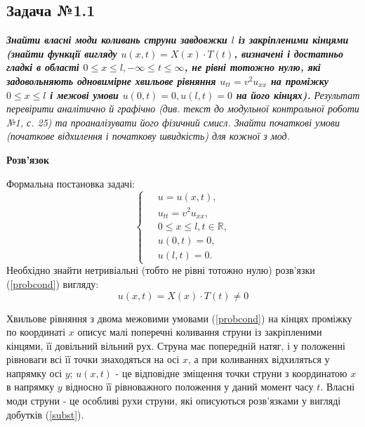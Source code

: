\subsection*{Задача №1.1}

\textit{\textbf{Знайти власні моди коливань струни завдовжки $l$ із закріпленими кінцями (знайти функції вигляду $u(x,t) = X(x) \cdot T(t)$, визначені і достатньо гладкі в області $0 \leq x \leq l, -\infty \leq t \leq \infty$, не рівні тотожно нулю, які задовольняють одновимірне хвильове рівняння $u_{tt} = v^2 u_{xx}$ на проміжку $0 \leq x \leq l$ і межові умови $u(0,t) = 0, u(l,t) = 0$ на його кінцях).} Результат перевірити аналітично й графічно (див. текст до модульної контрольної роботи №1, с. 25) та проаналізувати його фізичний смисл. Знайти початкові умови (початкове відхилення і початкову швидкість) для кожної з мод.}

\begin{center}
    \large{\textbf{Розв'язок}}
\end{center}

\noindent Формальна постановка задачі:
\begin{equation} \label{probcond}
    \left\{ \begin{aligned} %
        \;&u = u(x,t), \\
          &u_{tt} = v^2 u_{xx}, \\
          &0 \leq x \leq l, t \in \mathbb{R}, \\
          &u(0,t) = 0, \\
          &u(l,t) = 0. 
    \end{aligned} \right.
\end{equation}
Необхідно знайти нетривіальні (тобто не рівні тотожно нулю) розв'язки (\ref{probcond}) вигляду:
\begin{equation} \label{subst}
    u(x,t) = X(x) \cdot T(t) \neq 0 
\end{equation}

Хвильове рівняння з двома межовими умовами (\ref{probcond}) на кінцях проміжку по координаті $x$ описує малі поперечні коливання струни із закріпленими кінцями, її довільний вільний рух. Струна має попередній натяг, і у положенні рівноваги  всі її точки знаходяться на осі $x$, а при коливаннях відхиляться у напрямку осі $y$; $u(x,t)$ - це відповідне зміщення точки струни з координатою $x$ в напрямку $y$ відносно її рівноважного положення у даний момент часу $t$. Власні моди струни - це особливі рухи струни, які описуються розв'язками у вигляді добутків (\ref{subst}). 

